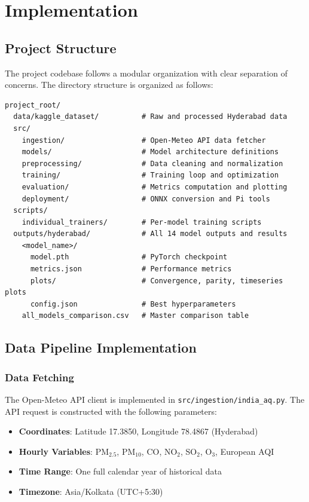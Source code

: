 \chapter{Implementation}

\section{Project Structure}

The project codebase follows a modular organization with clear separation of concerns. The directory structure is organized as follows:

\lstset{basicstyle=\ttfamily\footnotesize, numbers=none, frame=none}
\begin{lstlisting}
project_root/
  data/kaggle_dataset/          # Raw and processed Hyderabad data
  src/
    ingestion/                  # Open-Meteo API data fetcher
    models/                     # Model architecture definitions
    preprocessing/              # Data cleaning and normalization
    training/                   # Training loop and optimization
    evaluation/                 # Metrics computation and plotting
    deployment/                 # ONNX conversion and Pi tools
  scripts/
    individual_trainers/        # Per-model training scripts
  outputs/hyderabad/            # All 14 model outputs and results
    <model_name>/
      model.pth                 # PyTorch checkpoint
      metrics.json              # Performance metrics
      plots/                    # Convergence, parity, timeseries plots
      config.json               # Best hyperparameters
    all_models_comparison.csv   # Master comparison table
\end{lstlisting}

\section{Data Pipeline Implementation}

\subsection{Data Fetching}

The Open-Meteo API client is implemented in \texttt{src/ingestion/india\_aq.py}. The API request is constructed with the following parameters:

\begin{itemize}
    \item \textbf{Coordinates}: Latitude 17.3850, Longitude 78.4867 (Hyderabad)
    \item \textbf{Hourly Variables}: PM$_{2.5}$, PM$_{10}$, CO, NO$_2$, SO$_2$, O$_3$, European AQI
    \item \textbf{Time Range}: One full calendar year of historical data
    \item \textbf{Timezone}: Asia/Kolkata (UTC+5:30)
\end{itemize}

